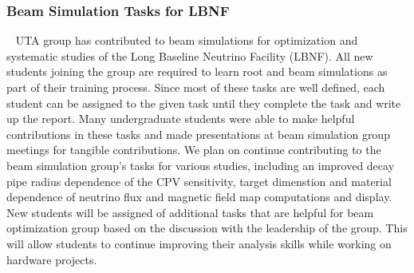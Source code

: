 \subsubsection {Beam Simulation Tasks for LBNF}~\label{ss:dune-beam-sim}
UTA group has contributed to beam simulations for optimization and systematic studies of the Long Baseline Neutrino Facility (LBNF).
All new students joining the group are required to learn root and beam simulations as part of their training process.  
Since most of these tasks are well defined, each student can be assigned to the given task until they complete the task and 
write up the report.
Many undergraduate students were able to make helpful contributions in these tasks and made presentations at beam simulation group 
meetings for tangible contributions.
We plan on continue contributing to the beam simulation group's tasks for various studies, including an improved decay pipe 
radius dependence of the CPV sensitivity, target dimenstion and material dependence of neutrino flux and magnetic field map 
computations and display.
New students will be assigned of additional tasks that are helpful for beam optimization group based on the discussion with the
leadership of the group.
This will allow students to continue improving their analysis skills while working on hardware projects.
%
%

%
%

